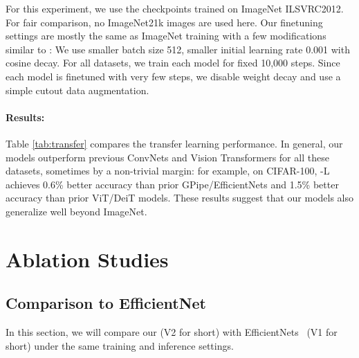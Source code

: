 \documentclass{article}
\begin{document}
\begin{table}[!ht]
    \vskip -0.15in
    \caption{
        Transfer learning datasets.
       }
    \centering
    \label{tab:transferdata}
    \vskip -0.1in
\end{table} 

For this experiment, we use the checkpoints trained on ImageNet ILSVRC2012. For fair comparison, no ImageNet21k images are used here. Our finetuning settings are mostly the same as ImageNet training with a few modifications similar to \cite{vit21,deit21}: We use smaller batch size 512, smaller initial learning rate 0.001 with cosine decay. For all datasets, we train each model for fixed 10,000 steps. Since each model is finetuned with very few steps, we disable weight decay and use a simple cutout data augmentation.

\paragraph{Results:} Table \ref{tab:transfer} compares the transfer learning performance. In general, our models outperform previous ConvNets and Vision Transformers for all these datasets, sometimes by a non-trivial margin: for example, on CIFAR-100, {\xnet}-L achieves 0.6\% better accuracy than prior GPipe/EfficientNets and 1.5\% better accuracy than prior ViT/DeiT models. These results suggest that our models also generalize well beyond ImageNet.



\section{Ablation Studies}
\label{sec:ablation}


\subsection{Comparison to EfficientNet}
In this section, we will compare our {\xnet} (V2 for short) with EfficientNets~\cite{efficientnet19} (V1 for short) under the same training and inference settings. 
\end{document}
